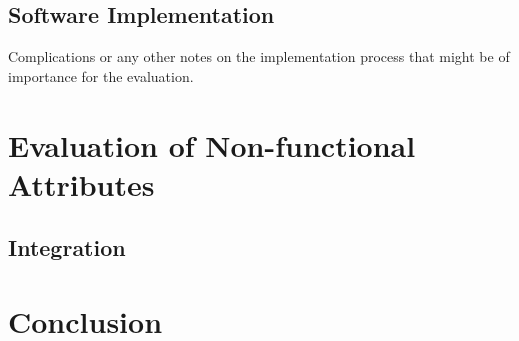 \subsection{Software Implementation}
\label{software_implementation}
Complications or any other notes on the implementation process that might be of
importance for the evaluation.





\section{Evaluation of Non-functional Attributes}
\label{evaluation_nonfunctional}

\subsection{Integration}
\label{integration}




\section{Conclusion}
\label{conclusion}




